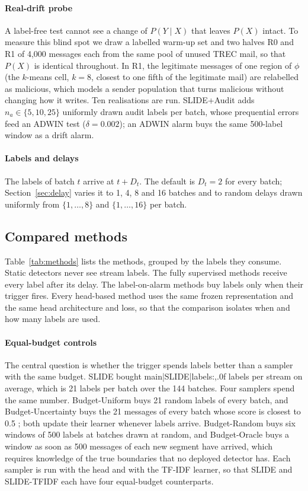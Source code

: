 \paragraph{Real-drift probe} A label-free test cannot see a change of $P(Y\mid X)$ that leaves $P(X)$ intact. To measure this blind spot we draw a labelled warm-up set and two halves R0 and R1 of 4{,}000 messages each from the same pool of unused TREC mail, so that $P(X)$ is identical throughout. In R1, the legitimate messages of one region of $\phi$ (the $k$-means cell, $k=8$, closest to one fifth of the legitimate mail) are relabelled as malicious, which models a sender population that turns malicious without changing how it writes. Ten realisations are run. SLIDE+Audit adds $n_a\in\{5,10,25\}$ uniformly drawn audit labels per batch, whose prequential errors feed an ADWIN test ($\delta=0.002$); an ADWIN alarm buys the same 500-label window as a drift alarm.

\paragraph{Labels and delays} The labels of batch $t$ arrive at $t+D_t$. The default is $D_t=2$ for every batch; Section~\ref{sec:delay} varies it to 1, 4, 8 and 16 batches and to random delays drawn uniformly from $\{1,\dots,8\}$ and $\{1,\dots,16\}$ per batch.

\subsection{Compared methods}
Table~\ref{tab:methods} lists the methods, grouped by the labels they consume. Static detectors never see stream labels. The fully supervised methods receive every label after its delay. The label-on-alarm methods buy labels only when their trigger fires. Every head-based method uses the same frozen representation and the same head architecture and loss, so that the comparison isolates when and how many labels are used.



\paragraph{Equal-budget controls} The central question is whether the trigger spends labels better than a sampler with the same budget. SLIDE bought {{main|SLIDE|labels:,.0f}} labels per stream on average, which is 21 labels per batch over the 144 batches. Four samplers spend the same number. Budget-Uniform buys 21 random labels of every batch, and Budget-Uncertainty buys the 21 messages of every batch whose score is closest to 0.5 \cite{zliobaite2014}; both update their learner whenever labels arrive. Budget-Random buys six windows of 500 labels at batches drawn at random, and Budget-Oracle buys a window as soon as 500 messages of each new segment have arrived, which requires knowledge of the true boundaries that no deployed detector has. Each sampler is run with the head and with the TF-IDF learner, so that SLIDE and SLIDE-TFIDF each have four equal-budget counterparts.

